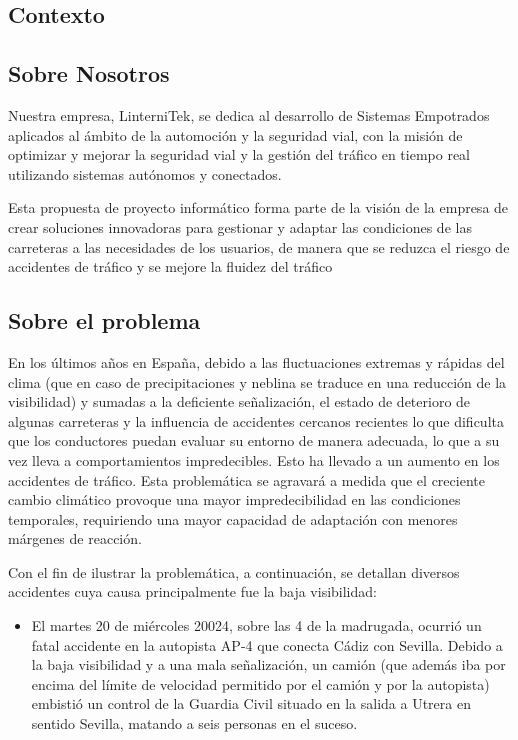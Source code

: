 \documentclass[
	a4paper, %
	12pt, %
]{CSSullivanBusinessReport}
\begin{document}
\newpage

\begin{fullwidth}
    

\section{Contexto}
\subsection{Sobre Nosotros}
Nuestra empresa, LinterniTek, se dedica al desarrollo de Sistemas Empotrados aplicados al ámbito de la automoción y la seguridad vial, con la misión de optimizar y mejorar la seguridad vial y la gestión del tráfico en tiempo real utilizando sistemas autónomos y conectados.  
\par
Esta propuesta de proyecto informático forma parte de la visión de la empresa de crear soluciones innovadoras para gestionar y adaptar las condiciones de las carreteras a las necesidades de los usuarios, de manera que se reduzca el riesgo de accidentes de tráfico y se mejore la fluidez del tráfico
\subsection{Sobre el problema }
En los últimos años en España, debido a las fluctuaciones extremas y rápidas del clima (que en caso de precipitaciones y neblina se traduce en una reducción de la visibilidad) y sumadas a la deficiente señalización, el estado de deterioro de algunas carreteras y la influencia de accidentes cercanos recientes lo que dificulta que los conductores puedan evaluar su entorno de manera adecuada, lo que a su vez lleva a comportamientos impredecibles. Esto ha llevado a un aumento en los accidentes de tráfico. Esta problemática se agravará a medida que el creciente cambio climático provoque una mayor impredecibilidad en las condiciones temporales, requiriendo una mayor capacidad de adaptación con menores márgenes de reacción. 
\par 
Con el fin de ilustrar la problemática, a continuación, se detallan diversos accidentes cuya causa principalmente fue la baja visibilidad: 
\begin{itemize}
    \item El martes 20 de miércoles 20024, sobre las 4 de la madrugada, ocurrió un fatal accidente en la autopista AP-4 que conecta Cádiz con Sevilla. Debido a la baja visibilidad y a una mala señalización, un camión (que además iba por encima del límite de velocidad permitido por el camión y por la autopista) embistió un control de la Guardia Civil situado en la salida a Utrera en sentido Sevilla, matando a seis personas en el suceso.


\end{itemize}
\end{fullwidth}
\end{document}
